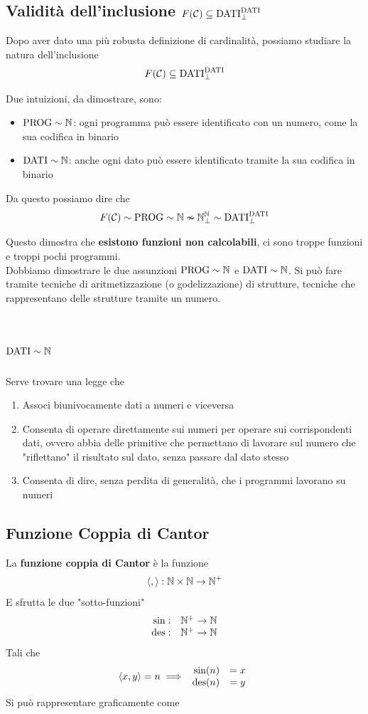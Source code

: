 \subsection{Validità dell'inclusione $F(\mathcal{C}) \subseteq \text{DATI}_\bot^{\text{DATI}}$}

Dopo aver dato una più robusta definizione di cardinalità, possiamo studiare la natura dell'inclusione
$$ F(\mathcal{C}) \subseteq \text{DATI}_\bot^{\text{DATI}} $$

Due intuizioni, da dimostrare, sono: 
\begin{itemize}
	\item $\text{PROG} \sim \mathbb{N}$: ogni programma può essere identificato con un numero, come la sua codifica in binario
	\item $\text{DATI} \sim \mathbb{N}$: anche ogni dato può essere identificato tramite la sua codifica in binario
\end{itemize}

Da questo possiamo dire che
$$ F(\mathcal{C}) \sim \text{PROG} \sim \mathbb{N} \nsim \mathbb{N}_\bot^{\mathbb{N}} \sim \text{DATI}_\bot^{\text{DATI}} $$

Questo dimostra che \textbf{esistono funzioni non calcolabili}, ci sono troppe funzioni e troppi pochi programmi.\\

Dobbiamo dimostrare le due assunzioni $\text{PROG} \sim \mathbb{N}$ e $\text{DATI} \sim \mathbb{N}$. Si può fare tramite tecniche di aritmetizzazione (o godelizzazione) di strutture, tecniche che rappresentano delle strutture tramite un numero.

\section{$\text{DATI} \sim \mathbb{N}$}
Serve trovare una legge che
\begin{enumerate}
	\item Associ biunivocamente dati a numeri e viceversa
	\item Consenta di operare direttamente sui numeri per operare sui corrispondenti dati, ovvero abbia delle primitive che permettano di lavorare sul numero che "riflettano" il risultato sul dato, senza passare dal dato stesso
	\item Consenta di dire, senza perdita di generalità, che i programmi lavorano su numeri
\end{enumerate}

\subsection{Funzione Coppia di Cantor}
La \textbf{funzione coppia di Cantor} è la funzione
$$ \langle , \rangle: \mathbb{N} \times \mathbb{N} \rightarrow \mathbb{N}^+ $$
E sfrutta le due "sotto-funzioni" 
$$
\begin{array}{r c}
	\sin: & \mathbb{N}^+ \rightarrow \mathbb{N} \\
	\operatorname{des}: & \mathbb{N}^+ \rightarrow \mathbb{N}
\end{array}
$$
Tali che 
$$ \langle x,y \rangle = n \implies \begin{array}{r c}
	\sin (n) & = x \\
	\operatorname{des} (n) & = y
\end{array}$$
Si può rappresentare graficamente come

